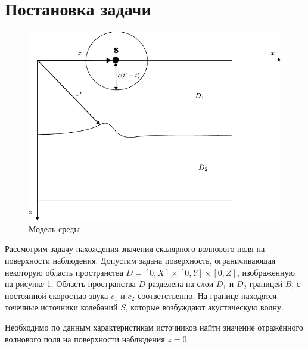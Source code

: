 \documentclass[a4paper, fontsize=14pt]{article}
\begin{document}
 
	
	
	\section{Постановка задачи} 
	\begin{figure}[h]
		
		\centering
		\includegraphics{migration_fig.pdf}
		
		\caption{Модель среды}
		\label{fig:mig}
	\end{figure}
	Рассмотрим задачу нахождения значения скалярного волнового поля на поверхности
	наблюдения.
	Допустим задана поверхность, ограничивающая некоторую область пространства
	$D=[0,X]\times [0,Y]\times [0,Z]$, изображённую на рисунке \ref{fig:mig}.
	Область пространства $D$ разделена на слои $D_1$ и $D_2$ границей $B$, с постоянной
	скоростью звука $c_1$ и $c_2$ соответственно.
	На границе находятся точечные источники колебаний $S$, которые возбуждают
	акустическую волну.
	
	Необходимо по данным характеристикам источников найти значение отражённого волнового поля
	на поверхности наблюдения $z=0$.
	
\end{document}
